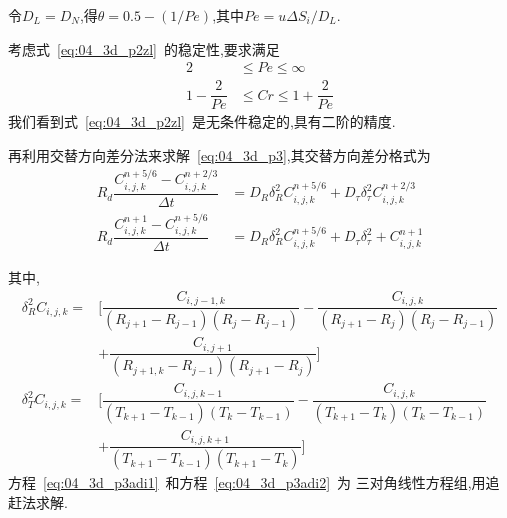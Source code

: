 \documentclass[xcolor=svgnames]{beamer} %
\begin{document}
\begin{frame}
令$D_L=D_N$,得$\theta=0.5-(1/Pe)$,其中$Pe=u\Delta S_i/D_L$.\par
考虑式~\eqref{eq:04_3d_p2zl}~的稳定性,要求满足
\begin{align}
2 & \leq Pe \leq \infty\\
1-\dfrac{2}{Pe}&\leq Cr\leq 1+\dfrac{2}{Pe}
\end{align}
我们看到式~\eqref{eq:04_3d_p2zl}~是无条件稳定的,具有二阶的精度.\par
\end{frame}
\begin{frame}
再利用交替方向差分法来求解~\eqref{eq:04_3d_p3},其交替方向差分格式为
\begin{align}
R_d\dfrac{C_{i,j,k}^{n+5/6}-C_{i,j,k}^{n+2/3}}{\Delta t} &=
D_R\delta_R^2 C_{i,j,k}^{n+5/6}+D_{\tau}\delta^2_{\tau}C_{i,j,k}^{n+2/3} \label{eq:04_3d_p3adi1}\\
R_d\dfrac{C_{i,j,k}^{n+1}-C_{i,j,k}^{n+5/6}}{\Delta t}&=D_R\delta_R^2 C_{i,j,k}^{n+5/6}+D_{\tau}\delta_{\tau}^2+C_{i,j,k}^{n+1} \label{eq:04_3d_p3adi2} 
\end{align}
\end{frame}
\begin{frame}
其中,
\begin{equation*}
\begin{split}
\delta_R^2 C_{i,j,k} =& [\dfrac{C_{i,j-1,k}}{(R_{j+1}-R_{j-1})(R_j-R_{j-1})}
-\dfrac{C_{i,j,k}}{(R_{j+1}-R_j)(R_j-R_{j-1})} \\
&+\dfrac{C_{i,j+1}}{(R_{j+1,k}-R_{j-1})(R_{j+1}-R_j)}] \\
\delta_T^2 C_{i,j,k} =& [\dfrac{C_{i,j,k-1}}{(T_{k+1}-T_{k-1})(T_k-T_{k-1})}-
\dfrac{C_{i,j,k}}{(T_{k+1}-T_k)(T_k-T_{k-1})} \\
&+\dfrac{C_{i,j,k+1}}{(T_{k+1}-T_{k-1})(T_{k+1}-T_k)}]
\end{split}
\end{equation*}
方程~\eqref{eq:04_3d_p3adi1}~和方程~\eqref{eq:04_3d_p3adi2}~为
三对角线性方程组,用追赶法求解.\par
\end{frame}
\end{document}
